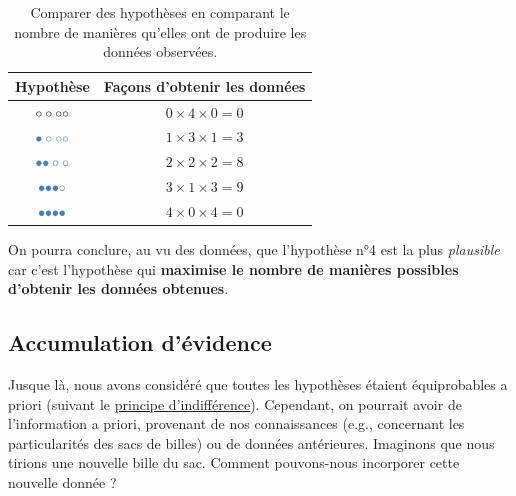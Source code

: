 \documentclass[
  a4paper,11pt,twoside,onecolumn,openright,final,oldfontcommands]{memoir}
\theoremstyle{definition}
\theoremstyle{definition}
\theoremstyle{definition}
\theoremstyle{definition}
\theoremstyle{remark}
\begin{document}
\begin{table}[!htb]

\begin{center}
\begin{threeparttable}

\caption{\label{tab:hypothesis-comparison}Comparer des hypothèses en comparant le nombre de manières qu'elles ont de produire les données observées.}

\begin{tabular}{cc}
\toprule
Hypothèse & Façons d'obtenir les données\\
\midrule
$\LARGE \circ \circ \circ \circ$ & $0 \times 4 \times 0 = 0$\\
$\LARGE \color{steelblue}{\bullet} \circ \circ \circ$ & $1 \times 3 \times 1 = 3$\\
$\LARGE \color{steelblue}{\bullet} \color{steelblue}{\bullet} \circ \circ$ & $2 \times 2 \times 2 = 8$\\
$\LARGE \color{steelblue}{\bullet} \color{steelblue}{\bullet} \color{steelblue}{\bullet} \circ$ & $3 \times 1 \times 3 = 9$\\
$\LARGE \color{steelblue}{\bullet} \color{steelblue}{\bullet} \color{steelblue}{\bullet} \color{steelblue}{\bullet}$ & $4 \times 0 \times 4 = 0$\\
\bottomrule
\end{tabular}

\end{threeparttable}
\end{center}

\end{table}

On pourra conclure, au vu des données, que l'hypothèse n°4 est la plus \emph{plausible} car c'est l'hypothèse qui \textbf{maximise le nombre de manières possibles d'obtenir les données obtenues}.

\hypertarget{accumulation-duxe9vidence}{%
\subsection{Accumulation d'évidence}\label{accumulation-duxe9vidence}}

Jusque là, nous avons considéré que toutes les hypothèses étaient équiprobables a priori (suivant le \href{https://en.wikipedia.org/wiki/Principle_of_indifference}{principe d'indifférence}). Cependant, on pourrait avoir de l'information a priori, provenant de nos connaissances (e.g., concernant les particularités des sacs de billes) ou de données antérieures. Imaginons que nous tirions une nouvelle bille du sac. Comment pouvons-nous incorporer cette nouvelle donnée ?
\end{document}

